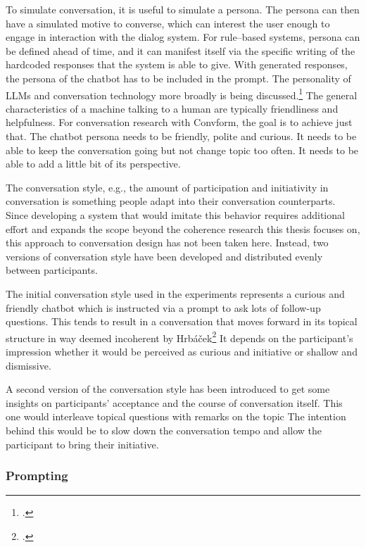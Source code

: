 \documentclass[12pt]{report}
\begin{document}
{To simulate conversation, it is useful to simulate a persona.
The persona can then have a simulated motive to converse, which can interest the user enough to engage in interaction with the dialog system.
For rule–based systems, persona can be defined ahead of time, and it can manifest itself via the specific writing of the hardcoded responses
that the system is able to give.
With generated responses, the persona of the chatbot has to be included in the prompt.
The personality of LLMs and conversation technology more broadly
is being discussed.\footcite{gpttoxicity, robopersona}
The general characteristics of a machine talking to a human are typically
friendliness and helpfulness.
For conversation research with Convform,
the goal is to achieve just that.
The chatbot persona needs to be friendly,
polite and curious.
It needs to be able to keep the conversation going
but not change topic too often.
It needs to be able to add a little bit of its perspective.
\par
The conversation style, e.g., the amount of participation and initiativity in conversation
is something people adapt into their conversation counterparts.
Since developing a system that would imitate this behavior
requires additional effort
and expands the scope beyond the coherence research
this thesis focuses on,
this approach to conversation design
has not been taken here.
Instead, two versions of conversation style
have been developed
and distributed evenly between participants.

\par
The initial conversation style used in the experiments
represents a curious and friendly chatbot
which is instructed via a prompt to ask lots of follow-up questions.
This tends to result in a conversation that moves forward in its topical structure
in way deemed incoherent by Hrbáček\footcite[p.~30]{hrbacek1994}
It depends on the participant's impression whether it would be perceived as
curious and initiative or shallow and dismissive.

\par
A second version of the conversation style has been introduced
to get some insights on participants' acceptance and
the course of conversation itself.
This one would interleave topical questions with remarks on the topic
The intention behind this would be to slow down the conversation tempo
and allow the participant to bring their initiative.

\subsubsection{Prompting}

}
\end{document}
